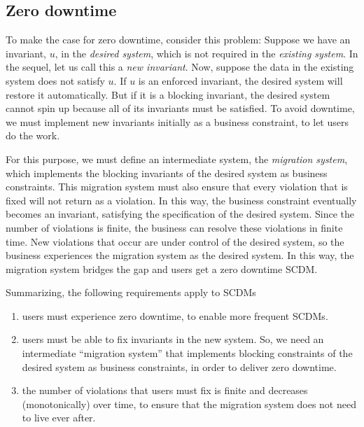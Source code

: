 \documentclass[runningheads]{llncs}
\def\define#1{\label{dfn:#1}{\em #1}\index{#1}}
\begin{document}
\subsection{Zero downtime}
   To make the case for zero downtime, consider this problem:
   Suppose we have an invariant, $u$, in the {\em desired system}, which is not required in the {\em existing system}.
   In the sequel, let us call this a {\em new invariant}.
   Now, suppose the data in the existing system does not satisfy $u$.
   If $u$ is an enforced invariant, the desired system will restore it automatically.
   But if it is a blocking invariant, the desired system cannot spin up because all of its invariants must be satisfied.
   To avoid downtime, we must implement new invariants initially as a business constraint,
   to let users do the work.

   For this purpose, we must define an intermediate system, the \define{migration system},
   which implements the blocking invariants of the desired system as business constraints.
   This migration system must also ensure that every violation that is fixed will not return as a violation.
   In this way, the business constraint eventually becomes an invariant, satisfying the specification of the desired system.
   Since the number of violations is finite, the business can resolve these violations in finite time.
   New violations that occur are under control of the desired system,
   so the business experiences the migration system as the desired system.
   In this way, the migration system bridges the gap and users get a zero downtime SCDM.

   Summarizing, the following requirements apply to SCDMs
\begin{enumerate}
\item users must experience zero downtime, to enable more frequent SCDMs.
\item users must be able to fix invariants in the new system.
   So, we need an intermediate ``migration system'' that implements blocking constraints of the desired system as business constraints,
   in order to deliver zero downtime.
\item the number of violations that users must fix is finite and decreases (monotonically) over time,
   to ensure that the migration system does not need to live ever after.
\end{enumerate}
\end{document}
